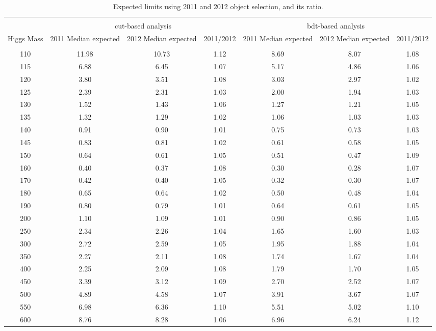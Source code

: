 \begin{table}[hbp!]
\begin{center}
\begin{tabular}{c c c c c c c}
\hline
\vspace{-3mm} && \\
              & \multicolumn{3}{|c|}{cut-based analysis} & \multicolumn{3}{|c|}{bdt-based analysis} \\
\hline
 Higgs Mass   & 2011 Median expected & 2012 Median expected & 2011/2012 & 2011 Median expected & 2012 Median expected & 2011/2012 \\
\vspace{-3mm} && \\
\hline
110 & 11.98 & 10.73 &  1.12  &  8.69 &  8.07 &  1.08 \\ 
115 &  6.88 &  6.45 &  1.07  &  5.17 &  4.86 &  1.06 \\ 
120 &  3.80 &  3.51 &  1.08  &  3.03 &  2.97 &  1.02 \\ 
125 &  2.39 &  2.31 &  1.03  &  2.00 &  1.94 &  1.03 \\ 
130 &  1.52 &  1.43 &  1.06  &  1.27 &  1.21 &  1.05 \\ 
135 &  1.32 &  1.29 &  1.02  &  1.06 &  1.03 &  1.03 \\ 
140 &  0.91 &  0.90 &  1.01  &  0.75 &  0.73 &  1.03 \\ 
145 &  0.83 &  0.81 &  1.02  &  0.61 &  0.58 &  1.05 \\ 
150 &  0.64 &  0.61 &  1.05  &  0.51 &  0.47 &  1.09 \\ 
160 &  0.40 &  0.37 &  1.08  &  0.30 &  0.28 &  1.07 \\ 
170 &  0.42 &  0.40 &  1.05  &  0.32 &  0.30 &  1.07 \\ 
180 &  0.65 &  0.64 &  1.02  &  0.50 &  0.48 &  1.04 \\ 
190 &  0.80 &  0.79 &  1.01  &  0.64 &  0.61 &  1.05 \\ 
200 &  1.10 &  1.09 &  1.01  &  0.90 &  0.86 &  1.05 \\ 
250 &  2.34 &  2.26 &  1.04  &  1.65 &  1.60 &  1.03 \\ 
300 &  2.72 &  2.59 &  1.05  &  1.95 &  1.88 &  1.04 \\ 
350 &  2.27 &  2.11 &  1.08  &  1.74 &  1.67 &  1.04 \\ 
400 &  2.25 &  2.09 &  1.08  &  1.79 &  1.70 &  1.05 \\ 
450 &  3.39 &  3.12 &  1.09  &  2.70 &  2.52 &  1.07 \\ 
500 &  4.89 &  4.58 &  1.07  &  3.91 &  3.67 &  1.07 \\ 
550 &  6.98 &  6.36 &  1.10  &  5.51 &  5.02 &  1.10 \\ 
600 &  8.76 &  8.28 &  1.06  &  6.96 &  6.24 &  1.12 \\\hline
\end{tabular}
\caption{Expected limits using 2011 and 2012 object selection, and its ratio.}
\label{tab:2011AnaResults}
\end{center}
\end{table}
